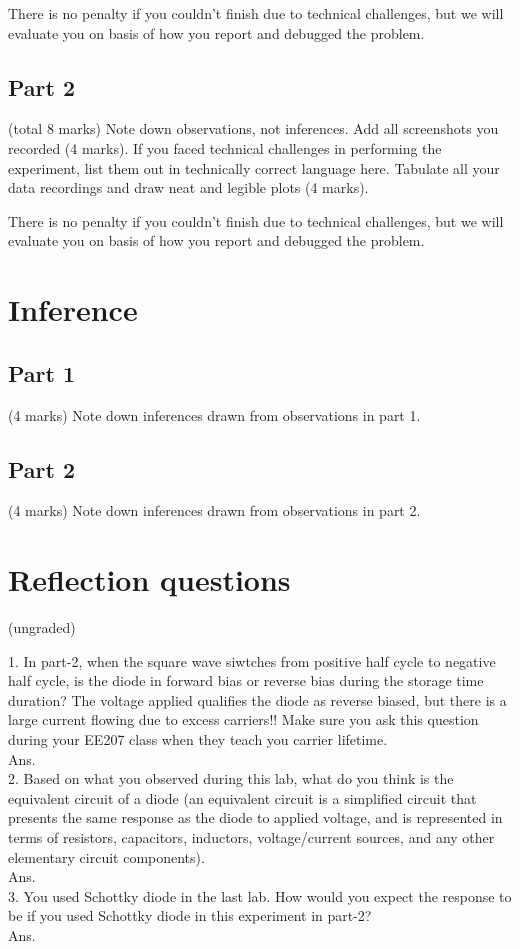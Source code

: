 \documentclass[12pt]{article}
\begin{document}
There is no penalty if you couldn't finish due to technical challenges, but we will evaluate you on basis of how you report and debugged the problem.

\subsection{Part 2}

(total 8 marks) Note down observations, not inferences. Add all screenshots you recorded (4 marks). If you faced technical challenges in performing the experiment, list them out in technically correct language here. Tabulate all your data recordings and draw neat and legible plots (4 marks).

There is no penalty if you couldn't finish due to technical challenges, but we will evaluate you on basis of how you report and debugged the problem.

\section{Inference}

\subsection{Part 1}

(4 marks) Note down inferences drawn from observations in part 1.

\subsection{Part 2}

(4 marks) Note down inferences drawn from observations in part 2.

\section{Reflection questions}

(ungraded)

1. In part-2, when the square wave siwtches from positive half cycle to negative half cycle, is the diode in forward bias or reverse bias during the storage time duration? The voltage applied qualifies the diode as reverse biased, but there is a large current flowing due to excess carriers!! Make sure you ask this question during your EE207 class when they teach you carrier lifetime.\\
Ans.\\

2. Based on what you observed during this lab, what do you think is the equivalent circuit of a diode (an equivalent circuit is a simplified circuit that presents the same response as the diode to applied voltage, and is represented in terms of resistors, capacitors, inductors, voltage/current sources, and any other elementary circuit components).\\
Ans.\\

3. You used Schottky diode in the last lab. How would you expect the response to be if you used Schottky diode in this experiment in part-2?\\
Ans.\\
\end{document}
